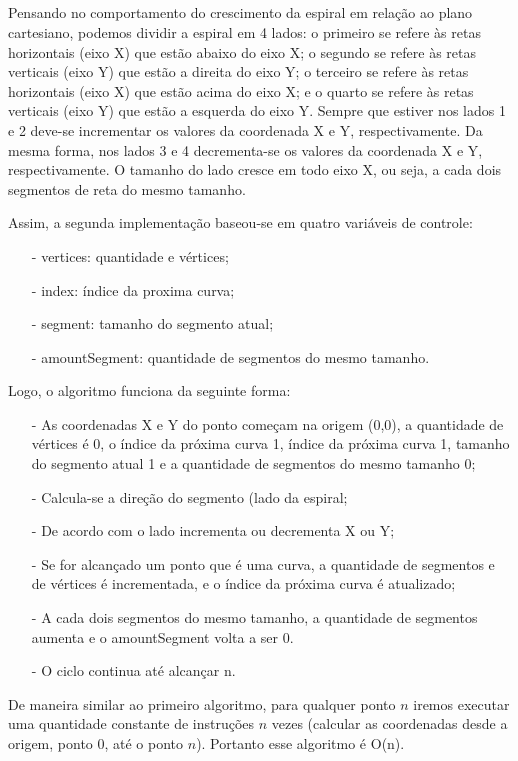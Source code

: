 \documentclass[12pt,a4paper]{article}
\begin{document}
    \subsection{}
        Pensando no comportamento do crescimento da espiral em relação ao plano cartesiano, podemos dividir a espiral em 4 lados: o primeiro se refere às retas horizontais (eixo X) que estão abaixo do eixo X; o segundo se refere às retas verticais (eixo Y) que estão a direita do eixo Y; o terceiro se refere às retas horizontais (eixo X) que estão acima do eixo X; e o quarto se refere às retas verticais (eixo Y) que estão a esquerda do eixo Y.
        Sempre que estiver nos lados 1 e 2 deve-se incrementar os valores da coordenada X e Y, respectivamente. Da mesma forma, nos lados 3 e 4 decrementa-se os valores da coordenada X e Y, respectivamente. O tamanho do lado cresce em todo eixo X, ou seja, a cada dois segmentos de reta do mesmo tamanho.
        
        Assim, a segunda implementação baseou-se em quatro variáveis de controle:
        \begin{itemize}
        	\item[-] vertices: quantidade e vértices;
        	\item[-] index: índice da proxima curva;
        	\item[-] segment: tamanho do segmento atual;
        	\item[-] amountSegment: quantidade de segmentos do mesmo tamanho.
    	\end{itemize}
    	
        Logo, o algoritmo funciona da seguinte forma:
        \begin{itemize}
    	    \item[-] As coordenadas X e Y do ponto começam na origem (0,0), a quantidade de vértices é 0, o índice da próxima curva 1, índice da próxima curva 1, tamanho do segmento atual 1 e a quantidade de segmentos do mesmo tamanho 0;
        	\item[-] Calcula-se a direção do segmento (lado da espiral;
        	\item[-] De acordo com o lado incrementa ou decrementa X ou Y;
        	\item[-] Se for alcançado um ponto que é uma curva, a quantidade de segmentos e de vértices é incrementada, e o índice da próxima curva é atualizado;
        	\item[-] A cada dois segmentos do mesmo tamanho, a quantidade de segmentos aumenta e o amountSegment volta a ser 0.
        	\item[-] O ciclo continua até alcançar n.
    	\end{itemize}
        De maneira similar ao primeiro algoritmo, para qualquer ponto $n$ iremos executar uma quantidade constante de instruções $n$ vezes (calcular as coordenadas desde a origem, ponto 0, até o ponto $n$). Portanto esse algoritmo é O(n).
    
\end{document}
